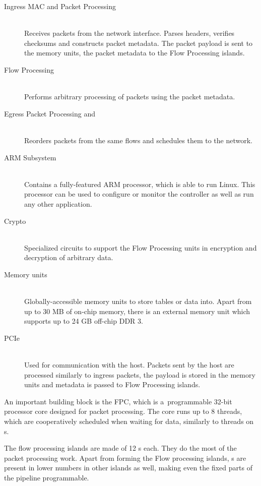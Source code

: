 \begin{description}
	\item[Ingress MAC and Packet Processing] \hfill \\
		Receives packets from the network interface. Parses headers, verifies
		checksums and constructs packet metadata. The packet payload is sent to
		the memory units, the packet metadata to the Flow Processing islands.
	\item[Flow Processing] \hfill \\
		Performs arbitrary processing of packets using the packet metadata.
	\item[Egress Packet Processing and ] \hfill \\
		Reorders packets from the same flows and schedules them to the network.
	\item[ARM Subsystem] \hfill \\
		Contains a fully-featured ARM processor, which is able to run Linux.
		This processor can be used to configure or monitor the controller as
		well as run any other application.
	\item[Crypto] \hfill \\
		Specialized circuits to support the Flow Processing units in encryption and
		decryption of arbitrary data.
	\item[Memory units] \hfill \\
		Globally-accessible memory units to store tables or data into. Apart
		from up to 30 MB of on-chip memory, there is an external memory unit which
		supports up to 24 GB off-chip DDR 3.
	\item[PCIe] \hfill \\
		Used for communication with the host. Packets sent by the host are
		processed similarly to ingress packets, the payload is stored in the
		memory units and metadata is passed to Flow Processing islands.
\end{description}

\noindent An important building block is the \acrfull{FPC}, which is a~programmable 32-bit
processor core designed for packet processing. The core runs up to 8 threads,
which are cooperatively scheduled when waiting for data, similarly to threads
on s.

The flow processing islands are made of 12 s each. They do the most of the
packet processing work. Apart from forming the Flow processing islands,
s are present in lower numbers in other islands as well, making even the
fixed parts of the pipeline programmable.


